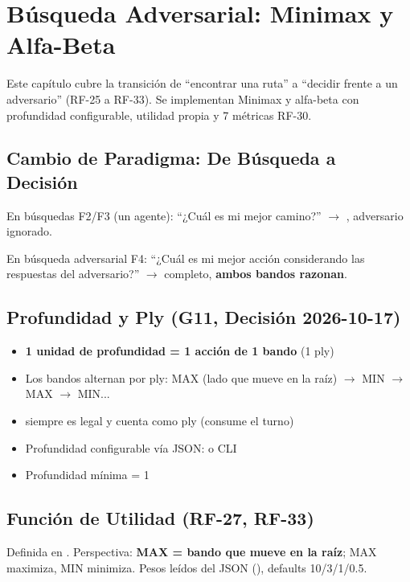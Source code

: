 \chapter{Búsqueda Adversarial: Minimax y Alfa-Beta}
\label{ch:adversarial}

Este capítulo cubre la transición de ``encontrar una ruta'' a ``decidir frente a un adversario''
(RF-25 a RF-33). Se implementan Minimax y alfa-beta con profundidad configurable, utilidad
propia y 7 métricas RF-30.

\section{Cambio de Paradigma: De Búsqueda a Decisión}
\label{sec:cambio-paradigma}

En búsquedas F2/F3 (un agente): ``¿Cuál es mi mejor camino?'' $\to$ ,
adversario ignorado.

En búsqueda adversarial F4: ``¿Cuál es mi mejor acción considerando las respuestas del
adversario?'' $\to$  completo, \textbf{ambos bandos razonan}.

\section{Profundidad y Ply (G11, Decisión 2026-10-17)}
\label{sec:profundidad-ply}

\begin{itemize}
\item \textbf{1 unidad de profundidad = 1 acción de 1 bando} (1 ply)
\item Los bandos alternan por ply: MAX (lado que mueve en la raíz) $\to$ MIN $\to$ MAX $\to$ MIN...
\item {} siempre es legal y cuenta como ply (consume el turno)
\item Profundidad configurable vía JSON:  o CLI 
\item Profundidad mínima = 1
\end{itemize}

\section{Función de Utilidad (RF-27, RF-33)}
\label{sec:utilidad}

Definida en . Perspectiva: \textbf{MAX = bando que mueve en la raíz};
MAX maximiza, MIN minimiza. Pesos leídos del JSON (), defaults 10/3/1/0.5.

